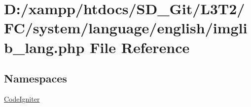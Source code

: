 \hypertarget{imglib__lang_8php}{}\section{D\+:/xampp/htdocs/\+S\+D\+\_\+\+Git/\+L3\+T2/\+F\+C/system/language/english/imglib\+\_\+lang.php File Reference}
\label{imglib__lang_8php}
\subsection*{Namespaces}
\begin{DoxyCompactItemize}
\item 
 \hyperlink{namespace_code_igniter}{Code\+Igniter}
\end{DoxyCompactItemize}

